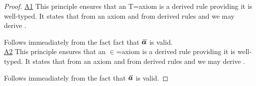 \begin{proof}
\underline{A1} 
This principle ensures that an T=axiom is a derived rule providing it is well-typed.
It states that from an axiom  and from derived rules
 \ZDelta and \ZDeltap we may derive
.

\vspace{1cm}
Follows immeadiately from the fact fact that $\Ibar$ is  valid.\\

\underline{A2} 
This principle ensures that an $\in$=axiom is a derived rule providing it is well-typed.
It states that from an axiom  and from derived rules
 \ZtDelta and \ZtpDelta we may derive
.

Follows immeadiately from the fact that $\Ibar$ is  valid. 
\end{proof}

